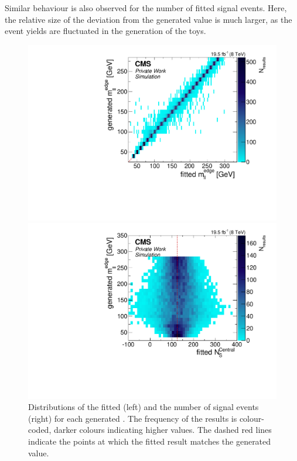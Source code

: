 Similar behaviour is also observed for the number of fitted signal events. Here, the relative size of the deviation from the generated value is much larger, as the event yields are fluctuated in the generation of the toys. 
\begin{figure}[!hbp]
  \centering
  \begin{minipage}[t]{0.49\textwidth}
    \includegraphics[width=\textwidth]{plots/results/fit/toyResults/generatedM0vsfittedM0_signalInjectedN125.pdf}
  \end{minipage}
  \begin{minipage}[t]{0.49\textwidth}
    \includegraphics[width=\textwidth]{plots/results/fit/toyResults/generatedM0vsfittedNS_signalInjectedN125.pdf}
  \end{minipage}
  \caption{Distributions of the fitted \mlledge (left) and the number of signal events (right) for each generated \mlledge. The frequency of the results is colour-coded, darker colours indicating higher values. The dashed red lines indicate the points at which the fitted result matches the generated value.}
    \label{fig:toys:scan}
\end{figure}

